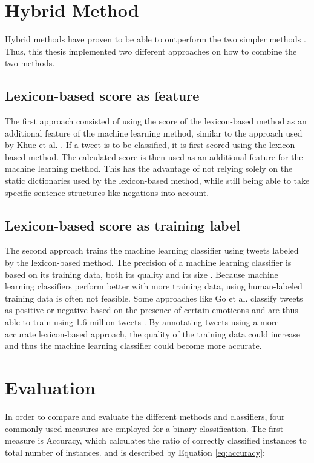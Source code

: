 \section{Hybrid Method}
Hybrid methods have proven to be able to outperform the two simpler methods \cite{khuc}. Thus, this thesis implemented two different approaches on how to combine the two methods.

\subsection{Lexicon-based score as feature}
The first approach consisted of using the score of the lexicon-based method as an additional feature of the machine learning method, similar to the approach used by Khuc et al. \cite{khuc}. If a tweet is to be classified, it is first scored using the lexicon-based method. The calculated score is then used as an additional feature for the machine learning method. This has the advantage of not relying solely on the static dictionaries used by the lexicon-based method, while still being able to take specific sentence structures like negations into account.
\subsection{Lexicon-based score as training label}
The second approach trains the machine learning classifier using tweets labeled by the lexicon-based method. The precision of a machine learning classifier is based on its training data, both its quality and its size \cite{DBLP:journals/csur/GiachanouC16}. Because machine learning classifiers perform better with more training data, using human-labeled training data is often not feasible. Some approaches like Go et al. classify tweets as positive or negative based on the presence of certain emoticons and are thus able to train using 1.6 million tweets \cite{GoBHaHua2009}. By annotating tweets using a more accurate lexicon-based approach, the quality of the training data could increase and thus the machine learning classifier could become more accurate.

\section{Evaluation}
In order to compare and evaluate the different methods and classifiers, four commonly used measures are employed for a binary classification. The first measure is Accuracy, which calculates the ratio of correctly classified instances to total number of instances. and is described by Equation \eqref{eq:accuracy}:

